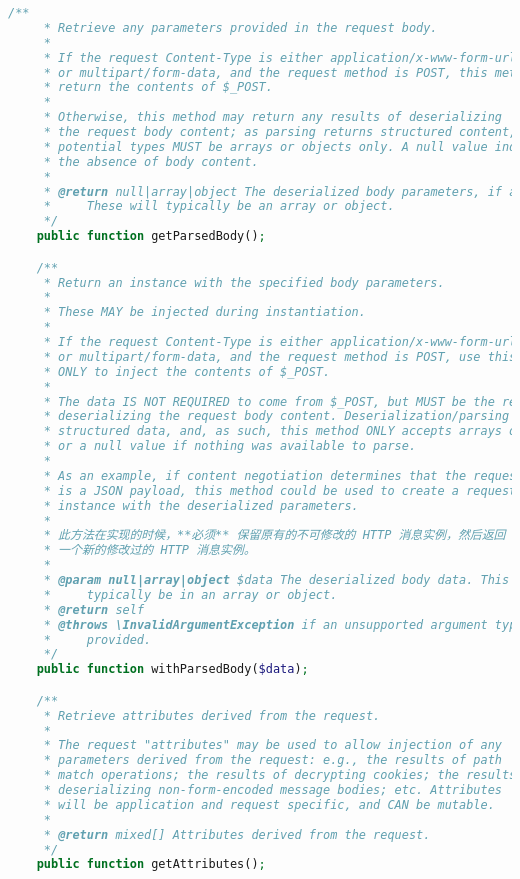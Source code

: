 \begin{lstlisting}[language=PHP]
    /**
     * Retrieve any parameters provided in the request body.
     *
     * If the request Content-Type is either application/x-www-form-urlencoded
     * or multipart/form-data, and the request method is POST, this method MUST
     * return the contents of $_POST.
     *
     * Otherwise, this method may return any results of deserializing
     * the request body content; as parsing returns structured content, the
     * potential types MUST be arrays or objects only. A null value indicates
     * the absence of body content.
     *
     * @return null|array|object The deserialized body parameters, if any.
     *     These will typically be an array or object.
     */
    public function getParsedBody();

    /**
     * Return an instance with the specified body parameters.
     *
     * These MAY be injected during instantiation.
     *
     * If the request Content-Type is either application/x-www-form-urlencoded
     * or multipart/form-data, and the request method is POST, use this method
     * ONLY to inject the contents of $_POST.
     *
     * The data IS NOT REQUIRED to come from $_POST, but MUST be the results of
     * deserializing the request body content. Deserialization/parsing returns
     * structured data, and, as such, this method ONLY accepts arrays or objects,
     * or a null value if nothing was available to parse.
     *
     * As an example, if content negotiation determines that the request data
     * is a JSON payload, this method could be used to create a request
     * instance with the deserialized parameters.
     *
     * 此方法在实现的时候，**必须** 保留原有的不可修改的 HTTP 消息实例，然后返回
     * 一个新的修改过的 HTTP 消息实例。
     *
     * @param null|array|object $data The deserialized body data. This will
     *     typically be in an array or object.
     * @return self
     * @throws \InvalidArgumentException if an unsupported argument type is
     *     provided.
     */
    public function withParsedBody($data);

    /**
     * Retrieve attributes derived from the request.
     *
     * The request "attributes" may be used to allow injection of any
     * parameters derived from the request: e.g., the results of path
     * match operations; the results of decrypting cookies; the results of
     * deserializing non-form-encoded message bodies; etc. Attributes
     * will be application and request specific, and CAN be mutable.
     *
     * @return mixed[] Attributes derived from the request.
     */
    public function getAttributes();


\end{lstlisting}
